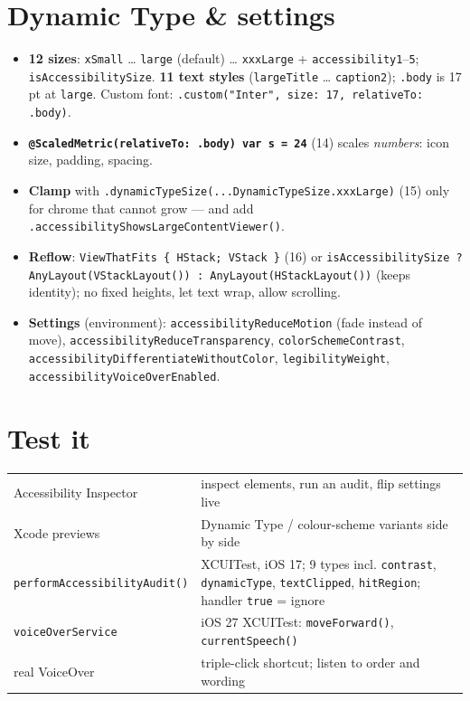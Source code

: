 \documentclass[8pt]{extarticle}
\begin{document}
\begin{multicols}{2}
\section{Dynamic Type \& settings}
\begin{itemize}
  \item \textbf{12 sizes}: \texttt{xSmall} … \texttt{large} (default) … \texttt{xxxLarge} +
        \texttt{accessibility1}–\texttt{5}; \texttt{isAccessibilitySize}. \textbf{11 text styles}
        (\texttt{largeTitle} … \texttt{caption2}); \texttt{.body} is 17 pt at \texttt{large}.
        Custom font: \texttt{.custom("Inter", size: 17, relativeTo: .body)}.
  \item \textbf{\texttt{@ScaledMetric(relativeTo: .body) var s = 24}} (14) scales \emph{numbers}: icon size,
        padding, spacing.
  \item \textbf{Clamp} with \texttt{.dynamicTypeSize(...DynamicTypeSize.xxxLarge)} (15) only for chrome that
        cannot grow — and add \texttt{.accessibilityShowsLargeContentViewer()}.
  \item \textbf{Reflow}: \texttt{ViewThatFits \{ HStack; VStack \}} (16) or
        \texttt{isAccessibilitySize ? AnyLayout(VStackLayout()) : AnyLayout(HStackLayout())} (keeps identity);
        no fixed heights, let text wrap, allow scrolling.
  \item \textbf{Settings} (environment): \texttt{accessibilityReduceMotion} (fade instead of move),
        \texttt{accessibilityReduceTransparency}, \texttt{colorSchemeContrast}, \texttt{accessibility\-DifferentiateWithoutColor},
        \texttt{legibilityWeight}, \texttt{accessibilityVoiceOverEnabled}.
\end{itemize}

\section{Test it}
{\footnotesize
\begin{tabular}{@{}L{25mm}L{52mm}@{}}
\toprule
Accessibility Inspector & inspect elements, run an audit, flip settings live \\
Xcode previews & Dynamic Type / colour-scheme variants side by side \\
\texttt{performAccessibility\-Audit()} & XCUITest, iOS 17; 9 types incl. \texttt{contrast},
  \texttt{dynamicType}, \texttt{textClipped}, \texttt{hitRegion}; handler \texttt{true} = ignore \\
\texttt{voiceOverService} & iOS 27 XCUITest: \texttt{moveForward()}, \texttt{currentSpeech()} \\
real VoiceOver & triple-click shortcut; listen to order and wording \\
\bottomrule
\end{tabular}\par}


\end{multicols}
\end{document}
